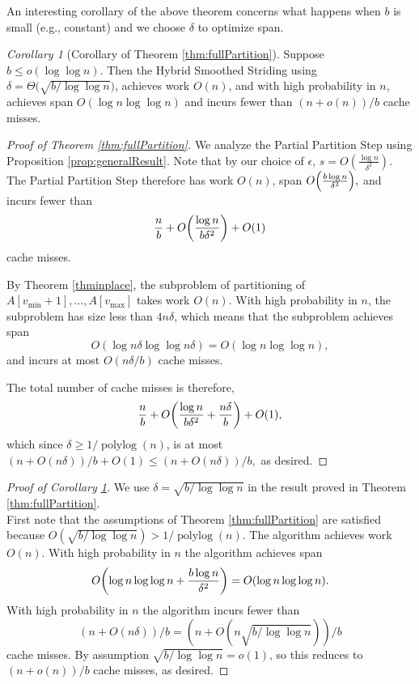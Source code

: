 \documentclass[twocolumn,10pt]{article}
\DeclarePairedDelimiter{\paren}{(}{)}
\newcommand{\polylog}{\operatorname{polylog}}
\theoremstyle{remark}
\newtheorem{corollary}[thm]{Corollary}
\theoremstyle{remark}
\begin{document}

An interesting corollary of the above theorem concerns what happens when $b$ is small (e.g., constant) and we choose $\delta$ to optimize span. 

\begin{corollary}[Corollary of Theorem \ref{thm:fullPartition}]
	\label{cor:fullPartition}
Suppose $b \le o(\log \log n)$. Then the Hybrid Smoothed Striding using $\delta
= \Theta\big(\sqrt{b/\log\log n}\big)$, achieves work $O(n)$, and with high
probability in $n$, achieves span $O(\log n \log\log n)$ and incurs fewer than
$(n+o(n))/b$ cache misses.
\end{corollary}

\begin{proof}[Proof of Theorem \ref{thm:fullPartition}]
  
  We analyze the Partial Partition Step using Proposition
  \ref{prop:generalResult}. Note that by our choice of $\epsilon$,
  $s=O\left(\frac{\log n}{\delta^2}\right)$.  The Partial Partition
  Step therefore has work $O(n)$, span $O\paren*{\frac{b\log
      n}{\delta^2}},$ and incurs fewer than
	$$\frac{n}{b}+O\paren*{\frac{\log n}{b\delta^2}}+O(1)$$ 
  cache misses.

  By Theorem \ref{thminplace}, the subproblem of partitioning of \\ $A[v_{\text{min}} + 1], \ldots,
   A[v_{\text{max}}]$ takes work $O(n)$. With high probability in $n$,
  the subproblem has size less than $4n\delta$, which means that the subproblem
  achieves span
  $$O(\log n\delta \log\log n\delta) = O(\log n \log\log n),$$
  and incurs at most $O(n \delta / b)$ cache misses.

  The total number of cache misses is therefore,
  	$$\frac{n}{b}+O\paren*{\frac{\log n}{b\delta^2} +
    \frac{n\delta}{b}}+O(1),$$ which since $\delta \ge 1 /
  \polylog(n)$, is at most $(n+O(n\delta))/b + O(1) \le (n + O(n
  \delta)) / b,$ as desired.
\end{proof}

\begin{proof}[Proof of Corollary \ref{cor:fullPartition}] We use $\delta = \sqrt{b/\log\log n}$ in the result proved in Theorem \ref{thm:fullPartition}. \\
	First note that the assumptions of Theorem \ref{thm:fullPartition} are satisfied because $O(\sqrt{b/\log\log n}) > 1 / \polylog(n).$
	The algorithm achieves work $O(n)$. 
	With high probability in $n$ the algorithm achieves span 
	$$O\paren*{\log n \log\log n +\frac{b\log n}{\delta^2}} = O(\log n\log\log n).$$
	With high probability in $n$ the algorithm incurs fewer than 
	$$(n+O(n\delta))/b = (n+O(n\sqrt{b/\log\log n}))/b$$ 
	cache misses.
	By assumption $\sqrt{b/\log\log n} = o(1)$, so this reduces to 
	$(n+o(n))/b$
	cache misses, as desired.
\end{proof}
\end{document}
